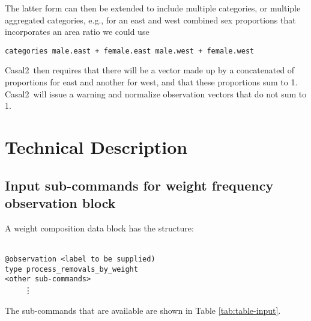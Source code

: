 \documentclass[a4paper,11pt,twoside,pdftex,draft]{article}
\newcommand{\CNAME}{Casal2}
\begin{document}
The latter form can then be extended to include multiple categories, or multiple aggregated categories, e.g., for an east and west combined sex proportions that incorporates an area ratio we could use

\texttt{categories male.east + female.east   male.west + female.west}

\CNAME~then requires that there will be a vector made up by a concatenated of proportions for east and another for west, and that these proportions sum to 1. \CNAME~will issue a warning and normalize observation vectors that do not sum to 1.

\section{Technical Description}

\subsection{Input sub-commands for weight frequency observation block}

A weight composition data block has the structure:

\texttt{\\
@observation <label to be supplied)\\
type process\_removals\_by\_weight\\
<other sub-commands>\\
}
\textcolor{white}{.}~~~~\vdots


The sub-commands that are available are shown in Table \ref{tab:table-input}.
\end{document}
